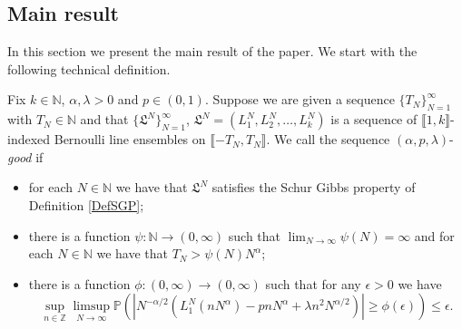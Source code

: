 \subsection{Main result}\label{Section2.3} In this section we present the main result of the paper. We start with the following technical definition.
\begin{definition}\label{Def1} Fix $k \in \mathbb{N}$, $\alpha, \lambda > 0$ and $p \in (0,1)$. Suppose we are given a sequence $\{ T_N \}_{N = 1}^\infty$ with $T_N \in \mathbb{N}$ and that $\{\mathfrak{L}^N\}_{N = 1}^\infty$, $\mathfrak{L}^N = (L^N_1, L^N_2, \dots, L^N_k)$ is a sequence of $\llbracket 1, k \rrbracket$-indexed Bernoulli line ensembles on $ \llbracket -T_N, T_N \rrbracket$. We call the sequence $(\alpha,p,\lambda)$-{\em good} if 
\begin{itemize}
\item for each $N \in \mathbb{N}$ we  have that $\mathfrak{L}^N$ satisfies the Schur Gibbs property of Definition \ref{DefSGP};  
\item there is a function $\psi: \mathbb{N} \rightarrow (0, \infty)$ such that $\lim_{N \rightarrow \infty} \psi(N) = \infty$ and for each $N \in \mathbb{N}$ we have that $ T_N > \psi(N)N^{\alpha}$;
\item  there is a function $\phi: (0, \infty) \rightarrow (0,\infty)$ such that for any $\epsilon > 0$ we have 
\begin{equation}\label{globalParabola}
 \sup_{n \in \mathbb{Z}} \limsup_{N \rightarrow \infty} \mathbb{P} \left( \left|N^{-\alpha/2}(L_1^N(n N^{\alpha}) - p n N^{\alpha} + \lambda n^2 N^{\alpha/2}) \right| \geq \phi(\epsilon) \right) \leq \epsilon.
\end{equation}
\end{itemize}
\end{definition}
